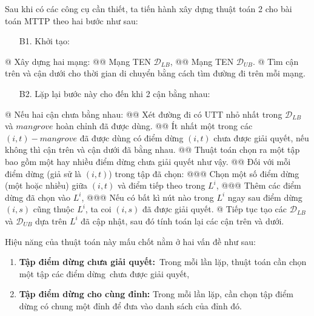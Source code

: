 \documentclass[../main.tex]{subfiles}
\begin{document}
Sau khi có các công cụ cần thiết, ta tiến hành xây dựng thuật toán 2 cho
bài toán MTTP theo hai bước như sau:



\begin{itemize}
  \item[B1.] Khởi tạo: 
\end{itemize}  
\begin{easylist}[itemize]
    @ Xây dựng hai mạng: 
        @@ Mạng TEN \(\mathcal D_{LB}\), 
        @@ Mạng TEN \(\mathcal D_{UB}\). 
    @ Tìm cận trên và cận dưới cho thời gian di chuyển bằng cách tìm đường đi trên mỗi mạng.
\end{easylist}

\begin{itemize}  
\item[B2.] Lặp lại bước này cho đến khi 2 cận bằng nhau: 
\end{itemize}
\begin{easylist}[itemize]
    @ Nếu hai cận chưa bằng nhau: 
        @@ Xét đường đi có UTT nhỏ nhất trong \(\mathcal D_{LB}\) và \(mangrove\) hoàn chỉnh đã được dùng. 
        @@ Ít nhất một trong các \((i,t)-mangrove\) đã được dùng có điểm dừng \((i,t)\) chưa được giải quyết, nếu không thì cận trên và cận dưới đã bằng nhau. 
        @@ Thuật toán chọn ra một tập bao gồm một hay nhiều điểm dừng chưa giải quyết như vậy.
        @@ Đối với mỗi điểm dừng (giả sử là \((i,t)\)) trong tập đã chọn: 
            @@@ Chọn một số điểm dừng (một hoặc nhiều) giữa \((i,t)\) và điểm tiếp theo trong \(L^i\), 
            @@@ Thêm các điểm dừng đã chọn vào \(L^i\), 
            @@@ Nếu có bất kì nút nào trong \(L^i\) ngay sau điểm dừng \((i,s)\) cũng thuộc \(L^i\), ta coi \((i,s)\) đã được giải quyết. 
    @ Tiếp tục tạo các \(\mathcal D_{LB}\) và \(\mathcal D_{UB}\) dựa trên \(L^i\) đã cập nhật, sau đó tính toán lại các cận trên và dưới.
\end{easylist}

Hiệu năng của thuật toán này mấu chốt nằm ở hai vấn đề như sau:

\begin{enumerate}
\def\labelenumi{\arabic{enumi}.}
\tightlist
\item
  \textbf{Tập điểm dừng chưa giải quyết:}~Trong mỗi lần lặp, thuật toán
  cần chọn một tập các điểm dừng~chưa được giải quyết,
\item
  \textbf{Tập điểm dừng cho cùng đỉnh:} Trong mỗi lần lặp, cần chọn tập
  điểm dừng có chung một đỉnh để đưa vào danh sách của đỉnh đó.
\end{enumerate}
\end{document}
